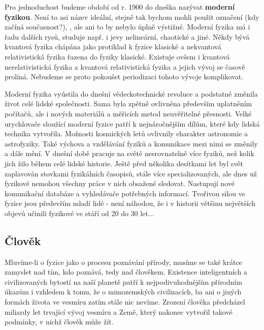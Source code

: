       
      Pro jednoduchost budeme období od r. 1900 do dneška nazývat \textbf{moderní fyzikou}. Není to
      asi název ideální, stejně tak bychom mohli použit označení  (kdy začíná
      současnost?), , ale ani to by nebylo úplně výstižné.
      Moderní fyzika má i řadu dalších rysů, studuje např. i jevy nelineární, chaotické a jiné.
      Někdy bývá kvantová fyzika chápána jako protiklad k fyzice klasické a nekvantová
      relativistická fyzika řazena do fyziky klasické. Existuje ovšem i kvantová nerelativistická
      fyzika a kvantová relativistická fyzika a jejich vývoj se časově prolíná. Nebudeme se proto
      pokoušet periodizaci tohoto vývoje komplikovat.

      Moderní fyzika vyústila do dnešní vědeckotechnické revoluce a podstatně změnila život celé
      lidské společnosti. Sama byla zpětně ovlivněna především uplatněním počítačů, ale i nových
      materiálů a měřicích metod neuvěřitelné přesnosti. Velké urychlovače sloužící moderní fyzice
      patří k nejnáročnějším dílům, které kdy lidská technika vytvořila. Možnosti kosmických letů
      ovlivnily charakter astronomie a astrofyziky. Také výchova a vzdělávání fyziků a komunikace
      mezi nimi se změnily a dále mění. V dnešní době pracuje na světě nesrovnatelně více fyziků,
      než kolik jich žilo během celé lidské historie. Ještě před několika desítkami let byl svět
      zaplavován stovkami fyzikálních časopisů, stále více specializovaných, ale dnes už fyzikové
      nemohou všechny práce v nich obsažené sledovat. Nastupují nové komunikační databáze a
      vyhledávače potřebných informací. Tvořivou silou ve fyzice jsou především mladí lidé - není
      náhodou, že i v historii většinu největších objevů učinili fyzikové ve stáří od 20 do 30
      let...

    \subsection{Člověk}\label{fyz:IchapIIsecIssecIII}
      Mluvíme-li o fyzice jako o procesu poznávání přírody, musíme se také krátce zamyslet nad tím,
      kdo poznává, tedy nad člověkem. Existence inteligentních a civilizovaných bytostí na naší
      planetě patří k nejpodivuhodnějším přírodním úkazům i vzhledem k tomu, že o mimozemských
      civilizacích, ba ani o jiných formách života ve vesmíru zatím stále nic nevíme. Zrození
      člověka předcházel miliardy let trvající vývoj vesmíru a Země, který nakonec vytvořil takové
      podmínky, v nichž člověk může žít.

